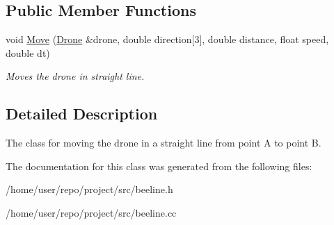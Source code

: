 \subsection*{Public Member Functions}
\begin{DoxyCompactItemize}
\item 
\mbox{\label{classBeeline_af53d1b01ae714fa2cd61f5a053165ca1}} 
void \hyperlink{classBeeline_af53d1b01ae714fa2cd61f5a053165ca1}{Move} (\hyperlink{classDrone}{Drone} \&drone, double direction\mbox{[}3\mbox{]}, double distance, float speed, double dt)
\begin{DoxyCompactList}\small\item\em Moves the drone in straight line. \end{DoxyCompactList}\end{DoxyCompactItemize}


\subsection{Detailed Description}
The class for moving the drone in a straight line from point A to point B. 

The documentation for this class was generated from the following files\+:\begin{DoxyCompactItemize}
\item 
/home/user/repo/project/src/beeline.\+h\item 
/home/user/repo/project/src/beeline.\+cc\end{DoxyCompactItemize}
